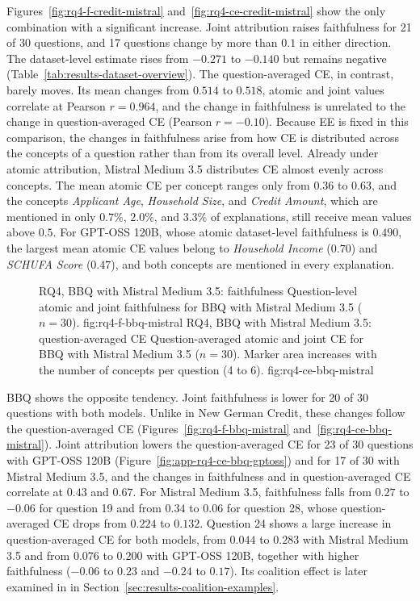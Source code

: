 Figures~\ref{fig:rq4-f-credit-mistral} and~\ref{fig:rq4-ce-credit-mistral} show the only combination with a significant increase. Joint attribution raises faithfulness for 21 of 30 questions, and 17 questions change by more than $0.1$ in either direction. The dataset-level estimate rises from $-0.271$ to $-0.140$ but remains negative (Table~\ref{tab:results-dataset-overview}). The question-averaged CE, in contrast, barely moves. Its mean changes from $0.514$ to $0.518$, atomic and joint values correlate at Pearson $r=0.964$, and the change in faithfulness is unrelated to the change in question-averaged CE (Pearson $r=-0.10$). Because EE is fixed in this comparison, the changes in faithfulness arise from how CE is distributed across the concepts of a question rather than from its overall level. Already under atomic attribution, Mistral Medium 3.5 distributes CE almost evenly across concepts. The mean atomic CE per concept ranges only from $0.36$ to $0.63$, and the concepts \textit{Applicant Age}, \textit{Household Size}, and \textit{Credit Amount}, which are mentioned in only $0.7\%$, $2.0\%$, and $3.3\%$ of explanations, still receive mean values above $0.5$. For GPT-OSS 120B, whose atomic dataset-level faithfulness is $0.490$, the largest mean atomic CE values belong to \textit{Household Income} ($0.70$) and \textit{SCHUFA Score} ($0.47$), and both concepts are mentioned in every explanation.

\begin{figure}[htb]
  \centering
    {RQ4, BBQ with Mistral Medium 3.5: faithfulness}%
    {Question-level atomic and joint faithfulness for BBQ with Mistral Medium 3.5 ($n=30$).}%
    {fig:rq4-f-bbq-mistral}%
  \hfill
    {RQ4, BBQ with Mistral Medium 3.5: question-averaged CE}%
    {Question-averaged atomic and joint CE for BBQ with Mistral Medium 3.5 ($n=30$). Marker area increases with the number of concepts per question (4 to 6).}%
    {fig:rq4-ce-bbq-mistral}%
\end{figure}

BBQ shows the opposite tendency. Joint faithfulness is lower for 20 of 30 questions with both models. Unlike in New German Credit, these changes follow the question-averaged CE (Figures~\ref{fig:rq4-f-bbq-mistral} and~\ref{fig:rq4-ce-bbq-mistral}). Joint attribution lowers the question-averaged CE for 23 of 30 questions with GPT-OSS 120B (Figure~\ref{fig:app-rq4-ce-bbq-gptoss}) and for 17 of 30 with Mistral Medium 3.5, and the changes in faithfulness and in question-averaged CE correlate at $0.43$ and $0.67$. For Mistral Medium 3.5, faithfulness falls from $0.27$ to $-0.06$ for question 19 and from $0.34$ to $0.06$ for question 28, whose question-averaged CE drops from $0.224$ to $0.132$. Question 24 shows a large increase in question-averaged CE for both models, from $0.044$ to $0.283$ with Mistral Medium 3.5 and from $0.076$ to $0.200$ with GPT-OSS 120B, together with higher faithfulness ($-0.06$ to $0.23$ and $-0.24$ to $0.17$). Its coalition effect is later examined in  in Section~\ref{sec:results-coalition-examples}.

